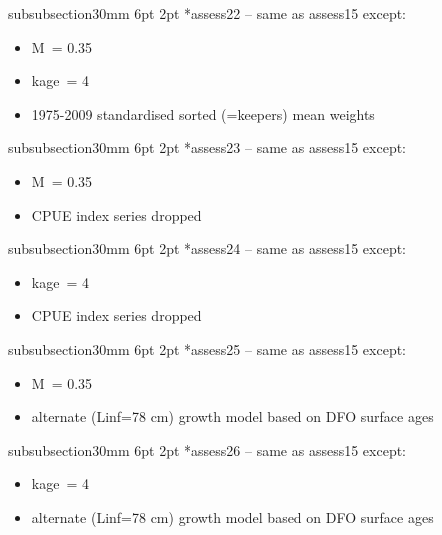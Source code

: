 \documentclass[11pt]{book}
\makeatletter
\renewcommand{\subsubsection}{\@startsection%
{subsubsection}{3}{0mm}%
{6pt \@plus -0pt \@minus -0pt}{2pt \@plus 0pt}%
{\normalfont\bf}}%
\makeatother
\begin{document}
\subsubsection*{assess22 -- same as assess15 except:}
\begin{itemize}[nosep]
  \item M~= 0.35
  \item kage~= 4
  \item 1975-2009 standardised sorted (=keepers) mean weights
\end{itemize}

\subsubsection*{assess23 -- same as assess15 except:}
\begin{itemize}[nosep]
  \item M~= 0.35
  \item CPUE index series dropped
\end{itemize}

\subsubsection*{assess24 -- same as assess15 except:}
\begin{itemize}[nosep]
  \item kage~= 4
  \item CPUE index series dropped
\end{itemize}

\subsubsection*{assess25 -- same as assess15 except:}
\begin{itemize}[nosep]
  \item M~= 0.35
  \item alternate (Linf=78 cm) growth model based on DFO surface ages
\end{itemize}

\subsubsection*{assess26 -- same as assess15 except:}
\begin{itemize}[nosep]
  \item kage~= 4
  \item alternate (Linf=78 cm) growth model based on DFO surface ages
\end{itemize}
\end{document}

